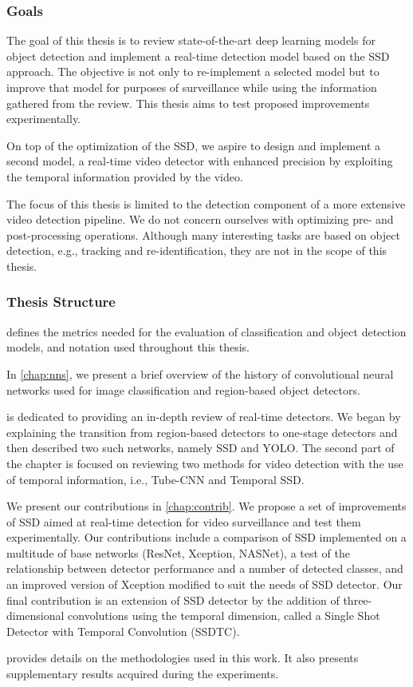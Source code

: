\subsubsection{Goals}
The goal of this thesis is to review state-of-the-art deep learning models for object detection and implement a real-time detection model based on the SSD approach. The objective is not only to re-implement a selected model but to improve that model for purposes of surveillance while using the information gathered from the review. This thesis aims to test proposed improvements experimentally. 

On top of the optimization of the SSD, we aspire to design and implement a second model, a real-time video detector with enhanced precision by exploiting the temporal information provided by the video.

The focus of this thesis is limited to the detection component of a more extensive video detection pipeline. We do not concern ourselves with optimizing pre- and post-processing operations. Although many interesting tasks are based on object detection, e.g., tracking and re-identification, they are not in the scope of this thesis.

\subsubsection{Thesis Structure}
 defines the metrics needed for the evaluation of classification and object detection models, and notation used throughout this thesis. 

In \cref{chap:nns}, we present a brief overview of the history of convolutional neural networks used for image classification and region-based object detectors. 

 is dedicated to providing an in-depth review of real-time detectors. We began by explaining the transition from region-based detectors to one-stage detectors and then described two such networks, namely SSD and YOLO. The second part of the chapter is focused on reviewing two methods for video detection with the use of temporal information, i.e., Tube-CNN and Temporal SSD. 

We present our contributions in \cref{chap:contrib}. We propose a set of improvements of SSD aimed at real-time detection for video surveillance and test them experimentally. Our contributions include a comparison of SSD implemented on a multitude of base networks (ResNet, Xception, NASNet), a test of the relationship between detector performance and a number of detected classes, and an improved version of Xception modified to suit the needs of SSD detector. Our final contribution is an extension of SSD detector by the addition of three-dimensional convolutions using the temporal dimension, called a Single Shot Detector with Temporal Convolution (SSDTC).

 provides details on the methodologies used in this work. It also presents supplementary results acquired during the experiments.